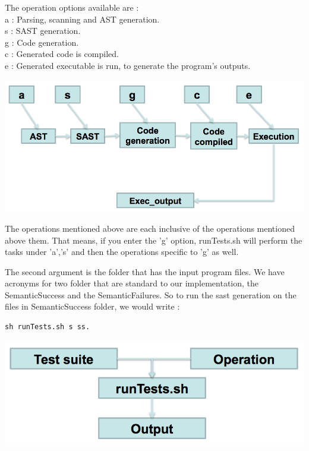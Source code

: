 The operation options available are :\\
a : Parsing, scanning and AST generation. \\
s : SAST generation.\\
g : Code generation.\\
c : Generated code is compiled.\\
e : Generated executable is run, to generate the program's outputs.\\ 
\begin{center}


\includegraphics[scale=0.60]{Test_diagrams/2.png}
\end{center}
The operations mentioned above are each inclusive of the operations mentioned above them. That means, if you enter the 'g' option, runTests.sh will perform the tasks under 'a','s' and then the operations specific to 'g' as well.

The second argument is the folder that has the input program files. We have acronyms for two folder that are standard to our implementation, the SemanticSuccess and the SemanticFailures. So to run the sast generation on the files in SemanticSuccess folder, we would write :
\\
\begin{lstlisting}
sh runTests.sh s ss.
\end{lstlisting}
\begin{center}
\includegraphics[scale=0.60]{Test_diagrams/1.png}
\end{center}

